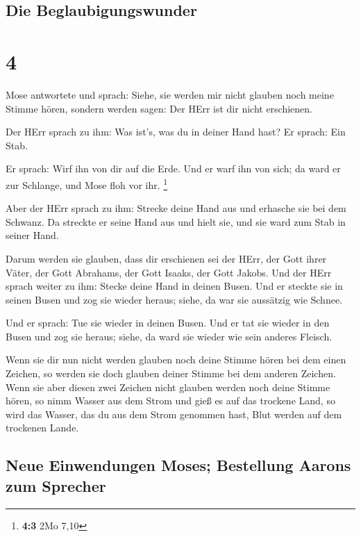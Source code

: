 \hypertarget{die-beglaubigungswunder}{%
\subsection{Die Beglaubigungswunder}\label{die-beglaubigungswunder}}

\hypertarget{section-3}{%
\section{4}\label{section-3}}

 Mose antwortete und sprach: Siehe, sie werden mir nicht
glauben noch meine Stimme hören, sondern werden sagen: Der HErr ist dir
nicht erschienen.

 Der HErr sprach zu ihm: Was ist's, was du in deiner Hand
hast? Er sprach: Ein Stab.

 Er sprach: Wirf ihn von dir auf die Erde. Und er warf ihn
von sich; da ward er zur Schlange, und Mose floh vor ihr. \footnote{\textbf{4:3}
  2Mo 7,10}

 Aber der HErr sprach zu ihm: Strecke deine Hand aus und
erhasche sie bei dem Schwanz. Da streckte er seine Hand aus und hielt
sie, und sie ward zum Stab in seiner Hand.

 Darum werden sie glauben, dass dir erschienen sei der
HErr, der Gott ihrer Väter, der Gott Abrahams, der Gott Isaaks, der Gott
Jakobs.  Und der HErr sprach weiter zu ihm: Stecke deine
Hand in deinen Busen. Und er steckte sie in seinen Busen und zog sie
wieder heraus; siehe, da war sie aussätzig wie Schnee.

 Und er sprach: Tue sie wieder in deinen Busen. Und er tat
sie wieder in den Busen und zog sie heraus; siehe, da ward sie wieder
wie sein anderes Fleisch.

 Wenn sie dir nun nicht werden glauben noch deine Stimme
hören bei dem einen Zeichen, so werden sie doch glauben deiner Stimme
bei dem anderen Zeichen.  Wenn sie aber diesen zwei
Zeichen nicht glauben werden noch deine Stimme hören, so nimm Wasser aus
dem Strom und gieß es auf das trockene Land, so wird das Wasser, das du
aus dem Strom genommen hast, Blut werden auf dem trockenen Lande.

\hypertarget{neue-einwendungen-moses-bestellung-aarons-zum-sprecher}{%
\subsection{Neue Einwendungen Moses; Bestellung Aarons zum
Sprecher}\label{neue-einwendungen-moses-bestellung-aarons-zum-sprecher}}

